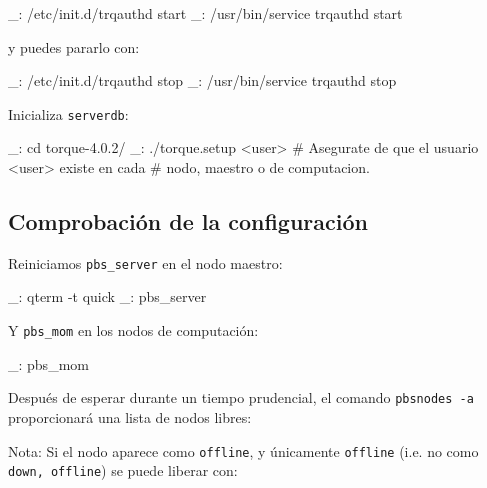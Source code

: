 \begin{bashcode}
_: /etc/init.d/trqauthd start
_: /usr/bin/service trqauthd start
\end{bashcode}

y puedes pararlo con:

\begin{bashcode}
_: /etc/init.d/trqauthd stop
_: /usr/bin/service trqauthd stop
\end{bashcode}

Inicializa \texttt{serverdb}:

\begin{bashcode}
_: cd torque-4.0.2/
_: ./torque.setup <user>   # Asegurate de que el usuario <user> existe en cada
                           # nodo, maestro o de computacion.
\end{bashcode}


\subsection{Comprobación de la configuración}


Reiniciamos \texttt{pbs\_server} en el nodo maestro:

\begin{bashcode}
_: qterm -t quick
_: pbs_server
\end{bashcode}

Y \texttt{pbs\_mom} en los nodos de computación:

\begin{bashcode}
_: pbs_mom
\end{bashcode}

Después de esperar durante un tiempo prudencial, el comando \texttt{pbsnodes -a} proporcionará una lista de nodos libres:


Nota: Si el nodo aparece como \texttt{offline}, y únicamente \texttt{offline} (i.e. no como \texttt{down, offline}) se puede liberar con:

